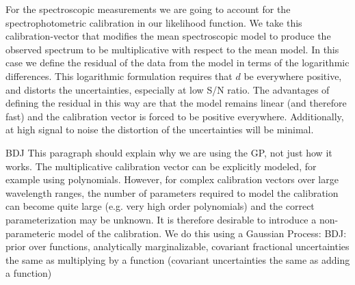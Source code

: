 \documentclass[iop,numberedappendix]{emulateapj}
\begin{document}
For the spectroscopic measurements we are going to account for
the spectrophotometric calibration in our likelihood function.  We
take this calibration-vector that modifies the mean spectroscopic
model to produce the observed spectrum to be multiplicative with
respect to the mean model.  In this case we define the residual of the
data from the model in terms of the logarithmic differences.  This
logarithmic formulation requires that $d$ be everywhere positive, and
distorts the uncertainties, especially at low S/N ratio.  The
advantages of defining the residual in this way are that the model
remains linear (and therefore fast) and the calibration vector is
forced to be positive everywhere.  Additionally, at high signal to
noise the distortion of the uncertainties will be minimal.

{\color{blue} BDJ This paragraph should explain why we are using the
GP, not just how it works.}
The multiplicative calibration vector can be explicitly modeled, for
example using polynomials.  However, for complex calibration vectors
over large wavelength ranges, the number of parameters required to
model the calibration can become quite large (e.g. very high order
polynomials) and the correct parameterization may be unknown.  It is
therefore desirable to introduce a non-parameteric model of the
calibration.  We do this using a Gaussian Process: BDJ: prior over
functions, analytically marginalizable, covariant fractional
uncertainties the same as multiplying by a function (covariant
uncertainties the same as adding a function)
\end{document}
